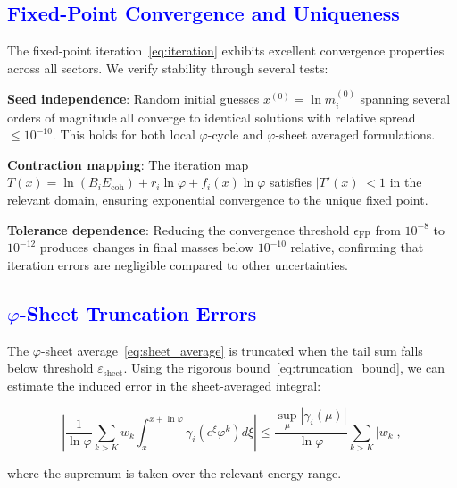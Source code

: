 \documentclass[%
amsmath,amssymb,
aps,
prb,
floatfix, showkeys, 10pt,
]{revtex4-2}
\newcommand{\modif}[1]{\textcolor{blue}{#1}}
\begin{document}
{\modif{\section{Fixed-Point Convergence and Uniqueness}
\label{subsec:fixed_point_stability}  }}

The fixed-point iteration~\eqref{eq:iteration} exhibits excellent convergence properties across all sectors. We verify stability through several tests:

\textbf{Seed independence}: Random initial guesses $x^{(0)} = \ln m_i^{(0)}$ spanning several orders of magnitude all converge to identical solutions with relative spread $\leq 10^{-10}$. This holds for both local $\varphi$-cycle and $\varphi$-sheet averaged formulations.

\textbf{Contraction mapping}: The iteration map $T(x) = \ln(B_i E_{\text{coh}}) + r_i \ln\varphi + f_i(x) \ln\varphi$ satisfies $|T'(x)| < 1$ in the relevant domain, ensuring exponential convergence to the unique fixed point.

\textbf{Tolerance dependence}: Reducing the convergence threshold $\epsilon_{\text{FP}}$ from $10^{-8}$ to $10^{-12}$ produces changes in final masses below $10^{-10}$ relative, confirming that iteration errors are negligible compared to other uncertainties.











{\modif{\section{$\varphi$-Sheet Truncation Errors}
\label{subsec:sheet_truncation}  }}

The $\varphi$-sheet average~\eqref{eq:sheet_average} is truncated when the tail sum falls below threshold $\varepsilon_{\text{sheet}}$. Using the rigorous bound~\eqref{eq:truncation_bound}, we can estimate the induced error in the sheet-averaged integral:

\begin{equation}
\left|\frac{1}{\ln\varphi} \sum_{k > K} w_k \int_x^{x+\ln\varphi} \gamma_i(e^\xi \varphi^k) d\xi\right| \leq \frac{\sup_{\mu} |\gamma_i(\mu)|}{\ln\varphi} \sum_{k > K} |w_k|,
\label{eq:sheet_error_bound}
\end{equation}

where the supremum is taken over the relevant energy range.
\end{document}
